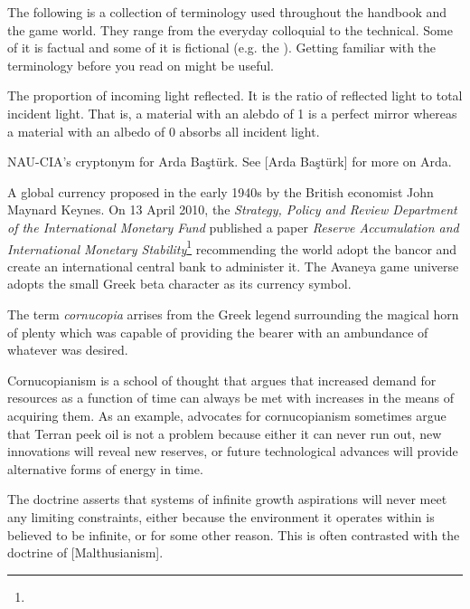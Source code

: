 

The following is a collection of terminology used throughout the handbook and the game world. They range from the everyday colloquial to the technical. Some of it is factual and some of it is fictional (e.g. the {\it \about[Jenya]}). Getting familiar with the terminology before you read on might be useful.

The proportion of incoming light reflected. It is the ratio of reflected light to total incident light. That is, a material with an alebdo of 1 is a perfect mirror whereas a material with an albedo of 0 absorbs all incident light.
\stopdefinition

NAU-CIA's cryptonym for Arda Baştürk. See [Arda Baştürk] for more on Arda.
\stopdefinition

A global currency proposed in the early 1940s by the British economist John Maynard Keynes. On 13 April 2010, the {\it Strategy, Policy and Review Department of the International Monetary Fund} published a paper {\it Reserve Accumulation and International Monetary Stability}\footnote{} recommending the world adopt the bancor and create an international central bank to administer it. The Avaneya game universe adopts the small Greek beta character  as its currency symbol.
\stopdefinition

The term {\it cornucopia} arrises from the Greek legend surrounding the magical horn of plenty which was capable of providing the bearer with an ambundance of whatever was desired.

Cornucopianism is a school of thought that argues that increased demand for resources as a function of time can always be met with increases in the means of acquiring them. As an example, advocates for cornucopianism sometimes argue that Terran peek oil is not a problem because either it can never run out, new innovations will reveal new reserves, or future technological advances will provide alternative forms of energy in time. 

The doctrine asserts that systems of infinite growth aspirations will never meet any limiting constraints, either because the environment it operates within is believed to be infinite, or for some other reason. This is often contrasted with the doctrine of [Malthusianism].
\stopdefinition

